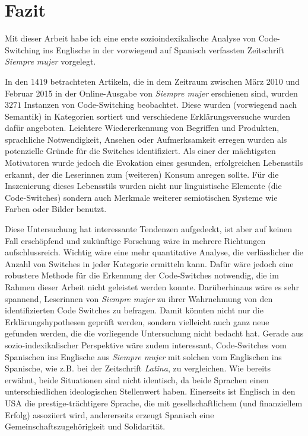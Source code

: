 \section{Fazit}
\label{chap:conclusion}

Mit dieser Arbeit habe ich eine erste sozioindexikalische Analyse von Code-Switching ins Englische in der vorwiegend auf Spanisch verfassten Zeitschrift \textit{Siempre mujer} vorgelegt.

In den $1419$ betrachteten Artikeln, die in dem Zeitraum zwischen März 2010 und Februar 2015 in der Online-Ausgabe von \textit{Siempre mujer} erschienen sind, wurden $3271$ Instanzen von Code-Switching beobachtet.
Diese wurden (vorwiegend nach Semantik) in Kategorien sortiert und verschiedene Erklärungsversuche wurden dafür angeboten.
Leichtere Wiedererkennung von Begriffen und Produkten, sprachliche Notwendigkeit, Ansehen oder Aufmerksamkeit erregen wurden als potenzielle Gründe für die Switches identifiziert.
Als einer der mächtigsten Motivatoren wurde jedoch die Evokation eines gesunden, erfolgreichen Lebensstils erkannt, der die Leserinnen zum (weiteren) Konsum anregen sollte.
Für die Inszenierung dieses Lebensstils wurden nicht nur linguistische Elemente (die Code-Switches) sondern auch Merkmale weiterer semiotischen Systeme wie Farben oder Bilder benutzt.

Diese Untersuchung hat interessante Tendenzen aufgedeckt, ist aber auf keinen Fall erschöpfend und zukünftige Forschung wäre in mehrere Richtungen aufschlussreich.
Wichtig wäre eine mehr quantitative Analyse, die verlässlicher die Anzahl von Switches in jeder Kategorie ermitteln kann.
Dafür wäre jedoch eine robustere Methode für die Erkennung der Code-Switches notwendig, die im Rahmen dieser Arbeit nicht geleistet werden konnte.
Darüberhinaus wäre es sehr spannend, Leserinnen von \textit{Siempre mujer} zu ihrer Wahrnehmung von den identifizierten Code Switches zu befragen.
Damit könnten nicht nur die Erklärungshypothesen geprüft werden, sondern vielleicht auch ganz neue gefunden werden, die die vorliegende Untersuchung nicht bedacht hat.
Gerade aus sozio-indexikalischer Perspektive wäre zudem interessant, Code-Switches vom Spanischen ins Englische aus \textit{Siempre mujer} mit solchen vom Englischen ins Spanische, wie z.B. bei der Zeitschrift \textit{Latina}, zu vergleichen.
Wie bereits erwähnt, beide Situationen sind nicht identisch, da beide Sprachen einen unterschiedlichen ideologischen Stellenwert haben.
Einerseits ist Englisch in den USA die prestige-trächtigere Sprache, die mit gesellschaftlichem (und finanziellem Erfolg) assoziiert wird,
andererseits erzeugt Spanisch eine Gemeinschaftszugehörigkeit und Solidarität.

